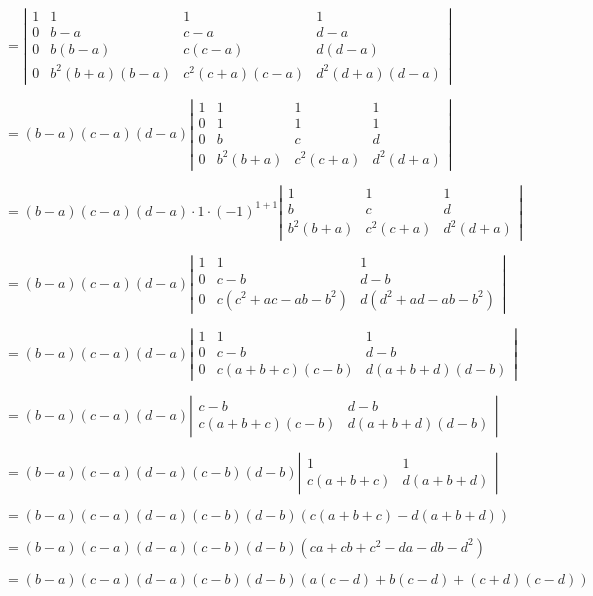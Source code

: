 $=\left|\begin{array}{cccc} 
    1 & 1 & 1 & 1 \\
    0 & b-a & c-a & d-a \\
    0 & b(b-a) & c(c-a) & d(d-a) \\
    0 & b^2(b+a)(b-a) & c^2(c+a)(c-a) & d^2(d+a)(d-a)
\end{array}\right|$

$=(b-a)(c-a)(d-a)\left|\begin{array}{cccc} 
    1 & 1 & 1 & 1 \\
    0 & 1 & 1 & 1 \\
    0 & b & c & d \\
    0 & b^2(b+a) & c^2(c+a) & d^2(d+a)
\end{array}\right|$

$=(b-a)(c-a)(d-a)\cdot 1\cdot(-1)^{1+1}\left|\begin{array}{ccc}
    1 & 1 & 1 \\
    b & c & d \\
    b^2(b+a) & c^2(c+a) & d^2(d+a)
\end{array}\right|$

$=(b-a)(c-a)(d-a)\left|\begin{array}{ccc}
    1 & 1 & 1 \\
    0 & c-b & d-b \\
    0 & c(c^2+ac-ab-b^2) & d(d^2+ad-ab-b^2)
\end{array}\right|$

$=(b-a)(c-a)(d-a)\left|\begin{array}{ccc}
    1 & 1 & 1 \\
    0 & c-b & d-b \\
    0 & c(a+b+c)(c-b) & d(a+b+d)(d-b)
\end{array}\right|$

$=(b-a)(c-a)(d-a)\left|\begin{array}{cc}
    c-b & d-b \\
    c(a+b+c)(c-b) & d(a+b+d)(d-b)
\end{array}\right|$

$=(b-a)(c-a)(d-a)(c-b)(d-b)\left|\begin{array}{cc}
    1 & 1 \\
    c(a+b+c) & d(a+b+d)
\end{array}\right|$

$=(b-a)(c-a)(d-a)(c-b)(d-b)(c(a+b+c)-d(a+b+d))$

$=(b-a)(c-a)(d-a)(c-b)(d-b)(ca+cb+c^2-da-db-d^2)$

$=(b-a)(c-a)(d-a)(c-b)(d-b)(a(c-d)+b(c-d)+(c+d)(c-d))$

